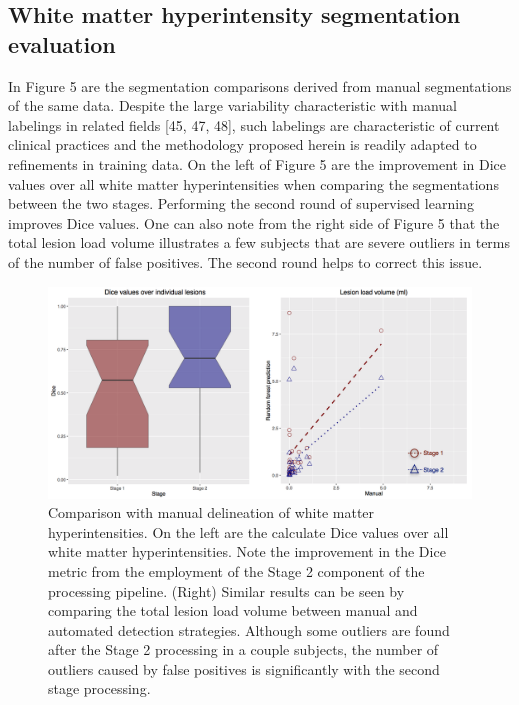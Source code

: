\documentclass[11pt,]{article}
\begin{document}
\subsection{White matter hyperintensity segmentation
evaluation}\label{white-matter-hyperintensity-segmentation-evaluation}

In Figure 5 are the segmentation comparisons derived from manual
segmentations of the same data. Despite the large variability
characteristic with manual labelings in related fields {[}45, 47, 48{]},
such labelings are characteristic of current clinical practices and the
methodology proposed herein is readily adapted to refinements in
training data. On the left of Figure 5 are the improvement in Dice
values over all white matter hyperintensities when comparing the
segmentations between the two stages. Performing the second round of
supervised learning improves Dice values. One can also note from the
right side of Figure 5 that the total lesion load volume illustrates a
few subjects that are severe outliers in terms of the number of false
positives. The second round helps to correct this issue.

\begin{figure}[htbp]
\centering
\includegraphics{Figures/llvAndDice.png}
\caption{Comparison with manual delineation of white matter
hyperintensities. On the left are the calculate Dice values over all
white matter hyperintensities. Note the improvement in the Dice metric
from the employment of the Stage 2 component of the processing pipeline.
(Right) Similar results can be seen by comparing the total lesion load
volume between manual and automated detection strategies. Although some
outliers are found after the Stage 2 processing in a couple subjects,
the number of outliers caused by false positives is significantly with
the second stage processing.}
\end{figure}
\end{document}
